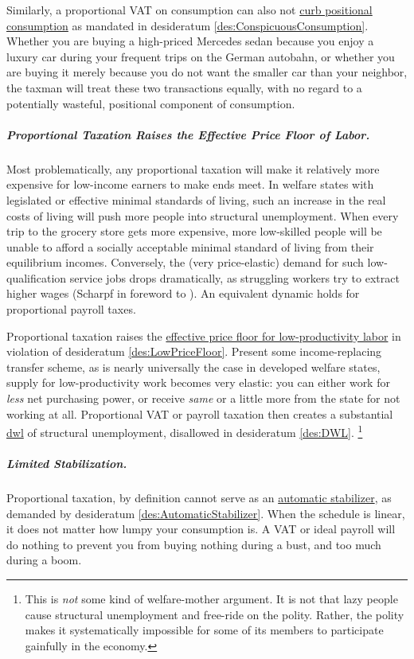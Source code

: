 Similarly, a proportional VAT on consumption can also not \hyperref[des:ConspicuousConsumption]{curb positional consumption} as mandated in desideratum \ref{des:ConspicuousConsumption}.
Whether you are buying a high-priced Mercedes sedan because you enjoy a luxury car during your frequent trips on the German autobahn, or whether you are buying it merely because you do not want the smaller car than your neighbor, the taxman will treat these two transactions equally, with no regard to a potentially wasteful, positional component of consumption.

\subparagraph{Proportional Taxation Raises the Effective Price Floor of Labor.}
	\label{sec:PropTaxDWL}
Most problematically, any proportional taxation will make it relatively more expensive for low-income earners to make ends meet.
In welfare states with legislated or effective minimal standards of living, such an increase in the real costs of living will push more people into structural unemployment.
When every trip to the grocery store gets more expensive, more low-skilled people will be unable to afford a socially acceptable minimal standard of living from their equilibrium incomes.
Conversely, the (very price-elastic) demand for such low-qualification service jobs drops dramatically, as struggling workers try to extract higher wages (Scharpf in foreword to \citealt[12ff]{Ganghof2004}).
An equivalent dynamic holds for proportional payroll taxes.

Proportional taxation raises the \hyperref[des:LowPriceFloor]{effective price floor for low-productivity labor} in violation of desideratum \ref{des:LowPriceFloor}.
Present some income-replacing transfer scheme, as is nearly universally the case in developed welfare states, supply for low-productivity work becomes very elastic:
you can either work for \emph{less} net purchasing power, or receive \emph{same} or a little more from the state for not working at all.
Proportional VAT or payroll taxation then creates a substantial \hyperref[des:DWL]{dwl} of structural unemployment, disallowed in desideratum \ref{des:DWL}.
\footnote{
	This is \emph{not} some kind of welfare-mother argument.
	It is not that lazy people cause structural unemployment and free-ride on the polity.
	Rather, the polity makes it systematically impossible for some of its members to participate gainfully in the economy.
}

\subparagraph{Limited Stabilization.}
Proportional taxation, by definition cannot serve as an \hyperref[des:AutomaticStabilizer]{automatic stabilizer}, as demanded by desideratum \ref{des:AutomaticStabilizer}.
When the schedule is linear, it does not matter how lumpy your consumption is.
A VAT or ideal payroll will do nothing to prevent you from buying nothing during a bust, and too much during a boom.

